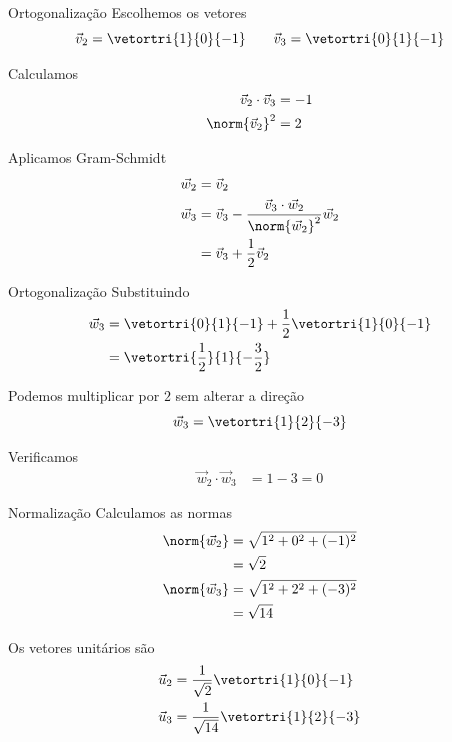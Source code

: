 \begin{resolution}{Ortogonalização}
  Escolhemos os vetores
  \[
      \vec{v}_{2}=\vetortri{1}{0}{-1}
      \qquad
      \vec{v}_{3}=\vetortri{0}{1}{-1}
  \]

  Calculamos
  \begin{align*}
      \vec{v}_{2}\cdot\vec{v}_{3}
      &=-1\\
      \norm{\vec{v}_{2}}^{2}
      &=2
  \end{align*}

  Aplicamos Gram-Schmidt
  \begin{align*}
      \vec{w}_{2}
      &=\vec{v}_{2}\\
      \vec{w}_{3}
      &=\vec{v}_{3}
      -\frac{\vec{v}_{3}\cdot\vec{w}_{2}}
      {\norm{\vec{w}_{2}}^{2}}\vec{w}_{2}\\
      &=\vec{v}_{3}+\frac{1}{2}\vec{v}_{2}
  \end{align*}
\end{resolution}

\begin{resolution}{Ortogonalização}
  Substituindo
  \begin{align*}
      \vec{w}_{3}
      &=
      \vetortri{0}{1}{-1}
      +\frac{1}{2}\vetortri{1}{0}{-1}\\
      &=
      \vetortri{\frac{1}{2}}{1}{-\frac{3}{2}}
  \end{align*}

  Podemos multiplicar por $2$ sem alterar a direção
  \[
      \vec{w}_{3}=\vetortri{1}{2}{-3}
  \]

  Verificamos
  \begin{align*}
      \vec{w}_{2}\cdot\vec{w}_{3}
      &=1-3=0
  \end{align*}
\end{resolution}

\begin{resolution}{Normalização}
  Calculamos as normas
  \begin{align*}
      \norm{\vec{w}_{2}}
      &=\sqrt{1^{2}+0^{2}+(-1)^{2}}\\
      &=\sqrt{2}\\
      \norm{\vec{w}_{3}}
      &=\sqrt{1^{2}+2^{2}+(-3)^{2}}\\
      &=\sqrt{14}
  \end{align*}

  Os vetores unitários são
  \begin{align*}
      \vec{u}_{2}
      &=\frac{1}{\sqrt{2}}
      \vetortri{1}{0}{-1}\\
      \vec{u}_{3}
      &=\frac{1}{\sqrt{14}}
      \vetortri{1}{2}{-3}
  \end{align*}
\end{resolution}

